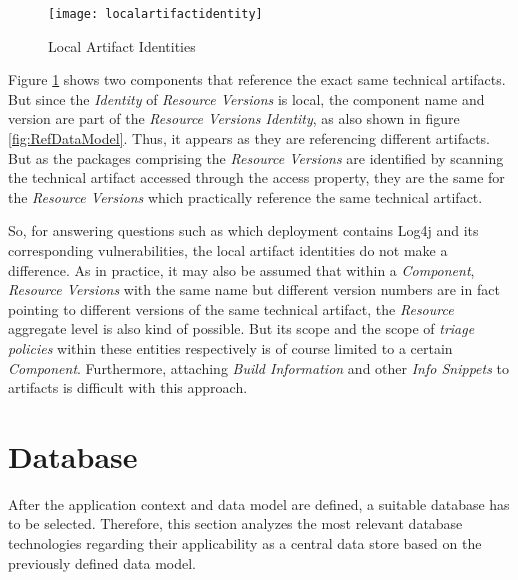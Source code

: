 \begin{figure}[H]
	\centering
	\texttt{[image: localartifactidentity]}
	\caption[Local Artifact Identities]{Local Artifact Identities }
	\label{fig:LocalArtifactIdentity}
\end{figure}

Figure \ref{fig:LocalArtifactIdentity} shows two components that reference the exact same technical artifacts. But since the \emph{Identity} of \emph{Resource Versions} is local, the component name and version are part of the \emph{Resource Versions Identity}, as also shown in figure \ref{fig:RefDataModel}. Thus, it appears as they are referencing different artifacts. But as the packages comprising the \emph{Resource Versions} are identified by scanning the technical artifact accessed through the access property, they are the same for the \emph{Resource Versions} which practically reference the same technical artifact.\par 
So, for answering questions such as which deployment contains Log4j and its corresponding vulnerabilities, the local artifact identities do not make a difference. As in practice, it may also be assumed that within a \emph{Component}, \emph{Resource Versions} with the same name but different version numbers are in fact pointing to different versions of the same technical artifact, the \emph{Resource} aggregate level is also kind of possible. But its scope and the scope of \emph{triage policies} within these entities respectively is of course limited to a certain \emph{Component}. Furthermore, attaching \emph{Build Information} and other \emph{Info Snippets} to artifacts is difficult with this approach.


\section{Database}
After the application context and data model are defined, a suitable database has to be selected. Therefore, this section analyzes the most relevant database technologies regarding their applicability as a central data store based on the previously defined data model.

